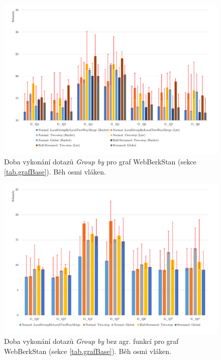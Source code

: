 \begin{figure}[!htp]
\includegraphics[width=\linewidth]{../img/webberkstanGroupByPar.pdf}\centering
\caption{Doba vykonání dotazů \textit{Group by} pro graf WebBerkStan (sekce \ref{tab.grafBase}). Běh osmi vláken.}
\label{figure.webberkstanGroupByPar}
\end{figure}
\begin{figure}[!htp]
\includegraphics[width=\linewidth]{../img/webberkstanGroupByParNoAgg.pdf}\centering
\caption{Doba vykonání dotazů \textit{Group by} bez agr. funkcí pro graf WebBerkStan (sekce \ref{tab.grafBase}). Běh osmi vláken.}
\label{figure.webberkstanGroupByParNoAgg}
\end{figure}

